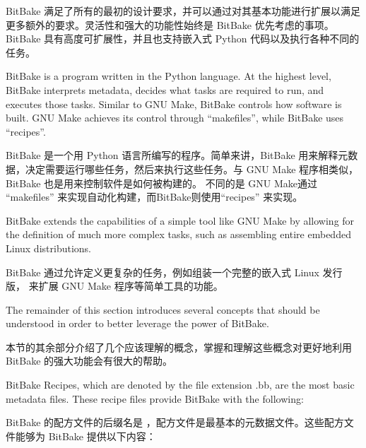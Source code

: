 BitBake 满足了所有的最初的设计要求，并可以通过对其基本功能进行扩展以满足更多额外的要求。灵活性和强大的功能性始终是 BitBake 优先考虑的事项。 BitBake 具有高度可扩展性，并且也支持嵌入式 Python 代码以及执行各种不同的任务。


BitBake is a program written in the Python language. At the highest level, BitBake interprets metadata, decides what tasks are required to run, and executes those tasks. Similar to GNU Make, BitBake controls how software is built. GNU Make achieves its control through ``makefiles'', while BitBake uses ``recipes''.

BitBake 是一个用 Python 语言所编写的程序。简单来讲，BitBake 用来解释元数据，决定需要运行哪些任务，然后来执行这些任务。与 GNU Make 程序相类似，BitBake 也是用来控制软件是如何被构建的。 不同的是 GNU Make通过 ``makefiles'' 来实现自动化构建，而BitBake则使用``recipes'' 来实现。

BitBake extends the capabilities of a simple tool like GNU Make by allowing for the definition of much more complex tasks, such as assembling entire embedded Linux distributions.

BitBake 通过允许定义更复杂的任务，例如组装一个完整的嵌入式 Linux 发行版， 来扩展 GNU Make 程序等简单工具的功能。

The remainder of this section introduces several concepts that should be understood in order to better leverage the power of BitBake.

本节的其余部分介绍了几个应该理解的概念，掌握和理解这些概念对更好地利用 BitBake 的强大功能会有很大的帮助。

\label{section:Recipes}

BitBake Recipes, which are denoted by the file extension .bb, are the most basic metadata files. These recipe files provide BitBake with the following:

BitBake 的配方文件的后缀名是 ，配方文件是最基本的元数据文件。这些配方文件能够为 BitBake 提供以下内容：

